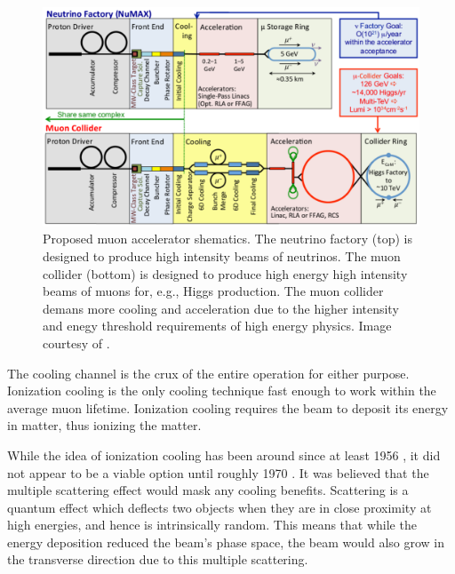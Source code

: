 \begin{figure}
  \centering
    \includegraphics[width=\textwidth]{Figures/muon_accelerator_schematic} 
  \caption[Proposed muon accelerator shematics.]{Proposed muon accelerator shematics. The neutrino factory (top) is designed to produce high intensity beams of neutrinos. The muon collider (bottom) is designed to produce high energy high intensity beams of muons for, e.g., Higgs production. The muon collider demans more cooling and acceleration due to the higher intensity and enegy threshold requirements of high energy physics. Image courtesy of \cite{map}.}
  \label{fig:muon_accelerator_schematic}
\end{figure}


The cooling channel is the crux of the entire operation for either purpose. Ionization cooling is the only cooling technique fast enough to work within the average muon lifetime. Ionization cooling requires the beam to deposit its energy in matter, thus ionizing the matter.

While the idea of ionization cooling has been around since at least 1956 \cite{oneill,lichtenberg}, it did not appear to be a viable option until roughly 1970 \cite{YuM}. It was believed that the multiple scattering effect would mask any cooling benefits. Scattering is a quantum effect which deflects two objects when they are in close proximity at high energies, and hence is intrinsically random. This means that while the energy deposition reduced the beam's phase space, the beam would also grow in the transverse direction due to this multiple scattering.

